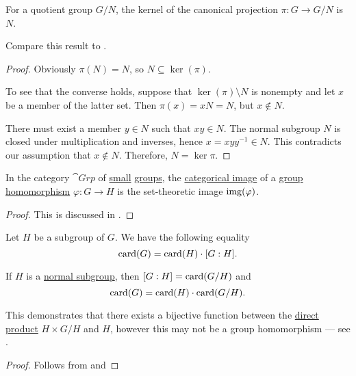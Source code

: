 \begin{proposition}\label{thm:group_kernel_of_canonical_projection}
  For a quotient group \( G / N \), the kernel of the canonical projection \( \pi: G \to G / N \) is \( N \).

  Compare this result to .
\end{proposition}
\begin{proof}
  Obviously \( \pi(N) = N \), so \( N \subseteq \ker(\pi) \).

  To see that the converse holds, suppose that \( \ker(\pi) \setminus N \) is nonempty and let \( x \) be a member of the latter set. Then \( \pi(x) = xN = N \), but \( x \not\in N \).

  There must exist a member \( y \in N \) such that \( xy \in N \). The normal subgroup \( N \) is closed under multiplication and inverses, hence \( x = xyy^{-1} \in N \). This contradicts our assumption that \( x \not\in N \). Therefore, \( N = \ker \pi \).
\end{proof}

\begin{proposition}\label{thm:cokernels_in_grp}
  In the category \hyperref[def:group/category]{\( \cat{Grp} \)} of \hyperref[def:category_size]{small} \hyperref[def:group]{groups}, the \hyperref[def:zero_morphisms/image]{categorical image} of a \hyperref[def:group/homomorphism]{group homomorphism} \( \varphi: G \to H \) is the set-theoretic image \( \operatorname{img}(\varphi) \).
\end{proposition}
\begin{proof}
  This is discussed in .
\end{proof}

\begin{theorem}\label{thm:lagranges_theorem_for_groups}
  Let \( H \) be a subgroup of \( G \). We have the following equality
  \begin{equation}\label{eq:thm:lagranges_theorem_for_groups/index}
    \operatorname{card}(G) = \operatorname{card}(H) \cdot [G : H].
  \end{equation}

  If \( H \) is a \hyperref[def:normal_subgroup]{normal subgroup}, then \( [G : H] = \operatorname{card}(G / H) \) and
  \begin{equation}\label{eq:thm:lagranges_theorem_for_groups/card}
    \operatorname{card}(G) = \operatorname{card}(H) \cdot \operatorname{card}(G / H).
  \end{equation}

  This demonstrates that there exists a bijective function between the \hyperref[def:group_direct_product]{direct product} \( H \times G / H \) and \( H \), however this may not be a group homomorphism --- see .
\end{theorem}
\begin{proof}
  Follows from  and 
\end{proof}

